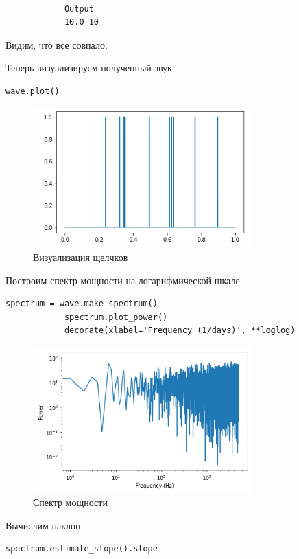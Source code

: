 \documentclass[a4paper,12pt]{article}
\begin{document}
\begin{enumerate}
\begin{lstlisting}[caption=Создание и воспроизведение UP]
			
			Output
			10.0 10
		\end{lstlisting}
		
		Видим, что все совпало.
		
		Теперь визуализируем полученный звук
		\begin{lstlisting}[caption=Визуализация щелчков]
			wave.plot()
		\end{lstlisting}
		\begin{figure}[H]
			\centering
			\includegraphics[width=0.75\textwidth]{4_1.png}
			\caption{Визуализация щелчков}
			\label{fig:4.1}
		\end{figure}
		
		Построим спектр мощности на логарифмической шкале.
		\begin{lstlisting}[caption=Спектр мощности]
			spectrum = wave.make_spectrum()
			spectrum.plot_power()
			decorate(xlabel='Frequency (1/days)', **loglog)
		\end{lstlisting}
		\begin{figure}[H]
			\centering
			\includegraphics[width=0.75\textwidth]{4_2.png}
			\caption{Спектр мощности}
			\label{fig:4.2}
		\end{figure}
		
		Вычислим наклон.
		\begin{lstlisting}[caption=Вычисление наклона]
			spectrum.estimate_slope().slope
			

\end{lstlisting}
\end{enumerate}
\end{document}
